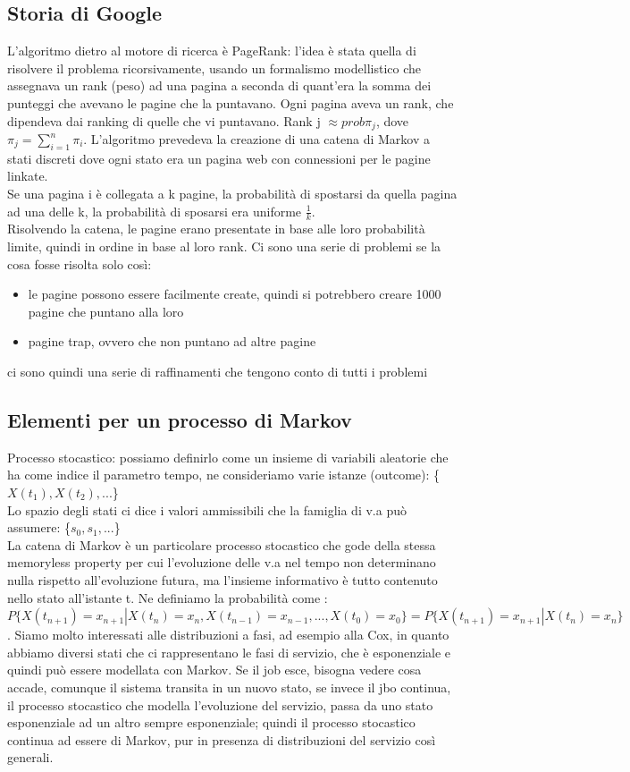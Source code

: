 \documentclass{article}
\begin{document}
\subsection{Storia di Google}
L'algoritmo dietro al motore di ricerca è PageRank: l'idea è stata quella di risolvere il problema ricorsivamente, usando un formalismo modellistico che assegnava un rank (peso) ad una pagina a seconda di quant'era la somma dei punteggi che avevano le pagine che la puntavano. Ogni pagina aveva un rank, che dipendeva dai ranking di quelle che vi puntavano. Rank j $\approx prob \pi_j$, dove $\pi_j = \sum\limits_{i=1}^{n} \pi_i$. L'algoritmo prevedeva la creazione di una catena di Markov a stati discreti dove ogni stato era un pagina web con connessioni per le pagine linkate.\\ Se una pagina i è collegata a k pagine, la probabilità di spostarsi da quella pagina ad una delle k, la probabilità di sposarsi era uniforme $\frac{1}{k}$.\\ Risolvendo la catena, le pagine erano presentate in base alle loro probabilità limite, quindi in ordine in base al loro rank. Ci sono una serie di problemi se la cosa fosse risolta solo così:
\begin{itemize}
\item le pagine possono essere facilmente create, quindi si potrebbero creare 1000 pagine che puntano alla loro
\item pagine trap, ovvero che non puntano ad altre pagine
\end{itemize}
ci sono quindi una serie di raffinamenti che tengono conto di tutti i problemi
\subsection{Elementi per un processo di Markov}
Processo stocastico: possiamo definirlo come un insieme di variabili aleatorie che ha come indice il parametro tempo, ne consideriamo varie istanze (outcome): \{$X(t_1), X(t_2),...$\}\\ Lo spazio degli stati ci dice i valori ammissibili che la famiglia di v.a può assumere: \{$s_0, s_1,...$\}\\ La catena di Markov è un particolare processo stocastico che gode della stessa memoryless property per cui l'evoluzione delle v.a nel tempo non determinano nulla rispetto all'evoluzione futura, ma l'insieme informativo è tutto contenuto nello stato all'istante t. Ne definiamo la probabilità come : $P\{X(t_{n+1}) = x_{n+1}|X(t_n) = x_n, X(t_{n-1}) = x_{n-1},...,X(t_0) = x_0\} = P\{X(t_{n+1}) = x_{n+1}|X(t_n) = x_n\}$. Siamo molto interessati alle distribuzioni a fasi, ad esempio alla Cox, in quanto abbiamo diversi stati che ci rappresentano le fasi di servizio, che è esponenziale e quindi può essere modellata con Markov. Se il job esce, bisogna vedere cosa accade, comunque il sistema transita in un nuovo stato, se invece il jbo continua, il processo stocastico che modella l'evoluzione del servizio, passa da uno stato esponenziale ad un altro sempre esponenziale; quindi il processo stocastico continua ad essere di Markov, pur in presenza di distribuzioni del servizio così generali.
\end{document}
